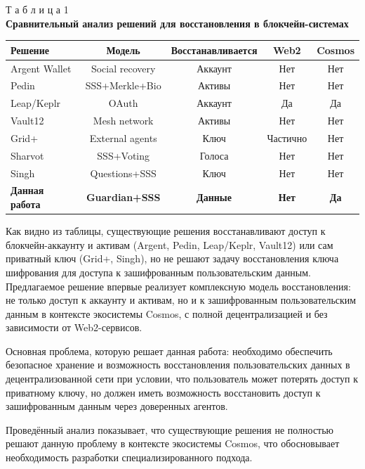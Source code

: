 \begin{table}[h]
\begin{flushright}
{Т а б л и ц а 1}\\
\centering
\textbf{Сравнительный анализ решений для восстановления в блокчейн-системах}
\end{flushright}
\centering
\begin{tabular}{|l|c|c|c|c|}
\hline
\textbf{Решение} & \textbf{Модель} & \textbf{Восстанавливается} & \textbf{Web2} & \textbf{Cosmos} \\
\hline
Argent Wallet & Social recovery & Аккаунт & Нет & Нет \\
\hline
Pedin~\cite{s15} & SSS+Merkle+Bio & Активы & Нет & Нет \\
\hline
Leap/Keplr & OAuth & Аккаунт & Да & Да \\
\hline
Vault12~\cite{s11} & Mesh network & Активы & Нет & Нет \\
\hline
Grid+~\cite{s12} & External agents & Ключ & Частично & Нет \\
\hline
Sharvot~\cite{s13} & SSS+Voting & Голоса & Нет & Нет \\
\hline
Singh~\cite{s14} & Questions+SSS & Ключ & Нет & Нет \\
\hline
\textbf{Данная работа} & \textbf{Guardian+SSS} & \textbf{Данные} & \textbf{Нет} & \textbf{Да} \\
\hline
\end{tabular}
\end{table}

Как видно из таблицы, существующие решения восстанавливают доступ к блокчейн-аккаунту и активам (Argent, Pedin, Leap/Keplr, Vault12) или сам приватный ключ (Grid+, Singh), но не решают задачу восстановления ключа шифрования для доступа к зашифрованным пользовательским данным. Предлагаемое решение впервые реализует комплексную модель восстановления: не только доступ к аккаунту и активам, но и к зашифрованным пользовательским данным в контексте экосистемы Cosmos, с полной децентрализацией и без зависимости от Web2-сервисов.

Основная проблема, которую решает данная работа: необходимо обеспечить безопасное хранение и возможность восстановления пользовательских данных в децентрализованной сети при условии, что пользователь может потерять доступ к приватному ключу, но должен иметь возможность восстановить доступ к зашифрованным данным через доверенных агентов.

Проведённый анализ показывает, что существующие решения не полностью решают данную проблему в контексте экосистемы Cosmos, что обосновывает необходимость разработки специализированного подхода.


